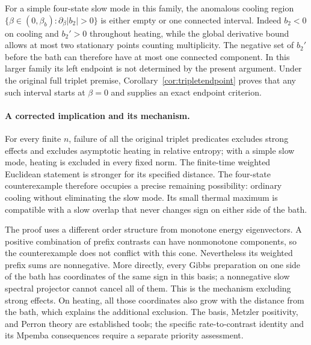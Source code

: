 For a simple four-state slow mode in this family, the anomalous cooling
region $\{\beta\in(0,\beta_b):\partial_\beta|b_2|>0\}$ is either empty or
one connected interval. Indeed $b_2<0$ on cooling and $b_2'>0$ throughout
heating, while the global derivative bound allows at most two stationary
points counting multiplicity. The negative set of $b_2'$ before the bath can therefore have at most
one connected component. In this larger family its left endpoint is not
determined by the present argument. Under the original full triplet premise,
Corollary~\ref{cor:tripletendpoint} proves that any such interval starts at
$\beta=0$ and supplies an exact endpoint criterion.

\paragraph{A corrected implication and its mechanism.}
For every finite $n$, failure of all the original triplet predicates excludes
strong effects and excludes asymptotic heating in relative entropy; with a
simple slow mode, heating is excluded in every fixed norm. The finite-time
weighted Euclidean statement is stronger for its specified distance. The
four-state counterexample therefore occupies a precise remaining possibility:
ordinary cooling without eliminating the slow mode. Its small thermal maximum
is compatible with a slow overlap that never changes sign on either side of
the bath.

The proof uses a different order structure from monotone energy eigenvectors.
A positive combination of prefix contrasts can have nonmonotone components,
so the counterexample does not conflict with this cone. Nevertheless its
weighted prefix sums are nonnegative. More directly, every Gibbs preparation
on one side of the bath has coordinates of the same sign in this basis; a
nonnegative slow spectral projector cannot cancel all of them. This is the
mechanism excluding strong effects. On heating, all those coordinates also
grow with the distance from the bath, which explains the additional exclusion.
The basis, Metzler positivity, and Perron theory are established tools; the
specific rate-to-contrast identity and its Mpemba consequences require a
separate priority assessment.
